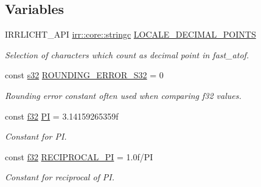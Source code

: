 \subsection*{Variables}
\begin{DoxyCompactItemize}
\item 
\mbox{\label{namespaceirr_1_1core_ac9e193c6850509dfee97f942b5f121a5}} 
I\+R\+R\+L\+I\+C\+H\+T\+\_\+\+A\+PI \hyperlink{namespaceirr_1_1core_ade1071a878633f2f6d8a75c5d11fec19}{irr\+::core\+::stringc} \hyperlink{namespaceirr_1_1core_ac9e193c6850509dfee97f942b5f121a5}{L\+O\+C\+A\+L\+E\+\_\+\+D\+E\+C\+I\+M\+A\+L\+\_\+\+P\+O\+I\+N\+TS}
\begin{DoxyCompactList}\small\item\em Selection of characters which count as decimal point in fast\+\_\+atof. \end{DoxyCompactList}\item 
\mbox{\label{namespaceirr_1_1core_aac9f99b6a999bdf25fec402c59e8342a}} 
const \hyperlink{namespaceirr_ac66849b7a6ed16e30ebede579f9b47c6}{s32} \hyperlink{namespaceirr_1_1core_aac9f99b6a999bdf25fec402c59e8342a}{R\+O\+U\+N\+D\+I\+N\+G\+\_\+\+E\+R\+R\+O\+R\+\_\+\+S32} = 0
\begin{DoxyCompactList}\small\item\em Rounding error constant often used when comparing f32 values. \end{DoxyCompactList}\item 
\mbox{\label{namespaceirr_1_1core_a26d877e2caf3e6f31c298a0417a0707e}} 
const \hyperlink{namespaceirr_a0277be98d67dc26ff93b1a6a1d086b07}{f32} \hyperlink{namespaceirr_1_1core_a26d877e2caf3e6f31c298a0417a0707e}{PI} = 3.\+14159265359f
\begin{DoxyCompactList}\small\item\em Constant for PI. \end{DoxyCompactList}\item 
\mbox{\label{namespaceirr_1_1core_ac97bfaa5b44703e61c23c91b88f3ec3a}} 
const \hyperlink{namespaceirr_a0277be98d67dc26ff93b1a6a1d086b07}{f32} \hyperlink{namespaceirr_1_1core_ac97bfaa5b44703e61c23c91b88f3ec3a}{R\+E\+C\+I\+P\+R\+O\+C\+A\+L\+\_\+\+PI} = 1.\+0f/\+PI
\begin{DoxyCompactList}\small\item\em Constant for reciprocal of PI. \end{DoxyCompactList}\item 

\end{DoxyCompactItemize}
